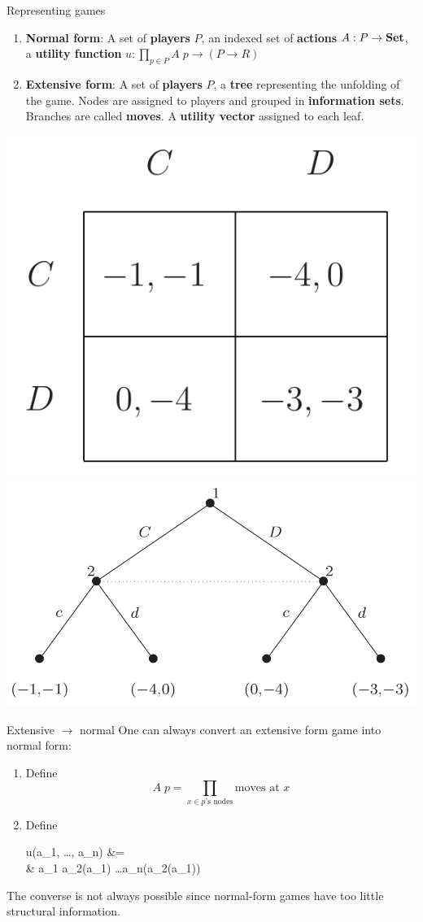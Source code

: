 \begin{frame}{Representing games}
	\vfill
	\begin{enumerate}
		\item \textbf{Normal form}:
		A set of \textbf{players} $P$, an indexed set of \textbf{actions} $A : P \to \mathbf{Set}$, a \textbf{utility function}
		$u : \prod_{p \in P} A\; p \to (P \to R)$

		\item \textbf{Extensive form}:
		A set of \textbf{players} $P$, a \textbf{tree} representing the unfolding of the game. Nodes are assigned to players and grouped in \textbf{information sets}. Branches are called \textbf{moves}. A \textbf{utility vector} assigned to each leaf.
	\end{enumerate}

	\vfill
	\begin{center}
		\includegraphics[width=.4\textwidth]{figures/pd_norm.png}
		\qquad
		\includegraphics[width=.5\textwidth]{figures/pd_ext.png}
	\end{center}
\end{frame}

\begin{frame}{Extensive $\to$ normal}
	One can always convert an extensive form game into normal form:

	\hfill
	\begin{enumerate}
		\item Define
		\begin{equation*}
			A\; p = \prod_{x \in \text{$p$'s nodes}} \text{moves at $x$}
		\end{equation*}
		\item Define
		\begin{eqalign*}
			u(a_1, \ldots, a_n) \quad &= \qquad {}\\
			& \to a_1 \to a_2(a_1) \to \ldots \to a_n(\cdots a_2(a_1))
		\end{eqalign*}
	\end{enumerate}

	\vfill
	The converse is not always possible since normal-form games have too little structural information.
\end{frame}

